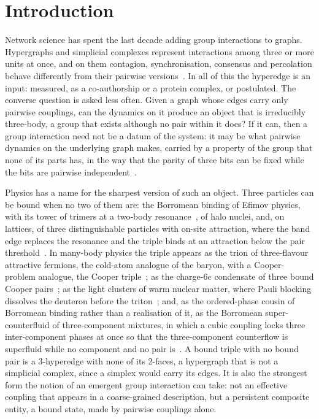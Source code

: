 \documentclass[aps,pre,twocolumn,superscriptaddress,floatfix]{revtex4-2}
\begin{document}
\section{Introduction}
Network science has spent the last decade adding group interactions to
graphs. Hypergraphs and simplicial complexes represent interactions
among three or more units at once, and on them contagion,
synchronisation, consensus and percolation behave differently from their
pairwise versions~\cite{battiston2020,battiston2021,bick2023,bianconi2021,lambiotte2019,iacopini2019,neuhauser2020,sun2023}.
In all of this the hyperedge is an input: measured, as a co-authorship
or a protein complex, or postulated. The converse question is asked less
often. Given a graph whose edges carry only pairwise couplings, can the
dynamics on it produce an object that is irreducibly three-body, a group
that exists although no pair within it does? If it can, then a group interaction need not be a datum of the
system: it may be what pairwise dynamics on the underlying graph makes,
carried by a property of the group that none of its parts has, in the
way that the parity of three bits can be fixed while the bits are
pairwise independent~\cite{williams2010,rosas2019}.

Physics has a name for the sharpest version of such an object. Three
particles can be bound when no two of them are: the Borromean binding of
Efimov physics, with its tower of trimers at a two-body
resonance~\cite{efimov1970,nielsen2001,kraemer2006,kunitski2015}, of halo
nuclei, and, on lattices, of three distinguishable particles with on-site
attraction, where the band edge replaces the resonance and the triple
binds at an attraction below the pair threshold~\cite{mattis1984,mattis1986}.
In many-body physics the triple appears as the trion of three-flavour
attractive fermions, the cold-atom analogue of the baryon, with a
Cooper-problem analogue, the Cooper
triple~\cite{niemann2012,akagami2021,tajima2022}; as the charge-$6e$
condensate of three bound Cooper pairs~\cite{ge2024}; as the light
clusters of warm nuclear matter, where Pauli blocking dissolves the
deuteron before the triton~\cite{typel2010}; and, as the ordered-phase
cousin of Borromean binding rather than a realisation of it, as the
Borromean super-counterfluid of three-component mixtures, in which a
cubic coupling locks three inter-component phases at once so that the
three-component counterflow is superfluid while no component and no
pair is~\cite{blomquist2021,babaev2024,kuklov2026}.
A bound triple with no bound pair is a $3$-hyperedge with none of its
$2$-faces, a hypergraph that is not a simplicial complex, since a
simplex would carry its edges. It is also the strongest form the notion
of an emergent group interaction can take: not an effective coupling
that appears in a coarse-grained description, but a persistent composite
entity, a bound state, made by pairwise couplings alone.
\end{document}
